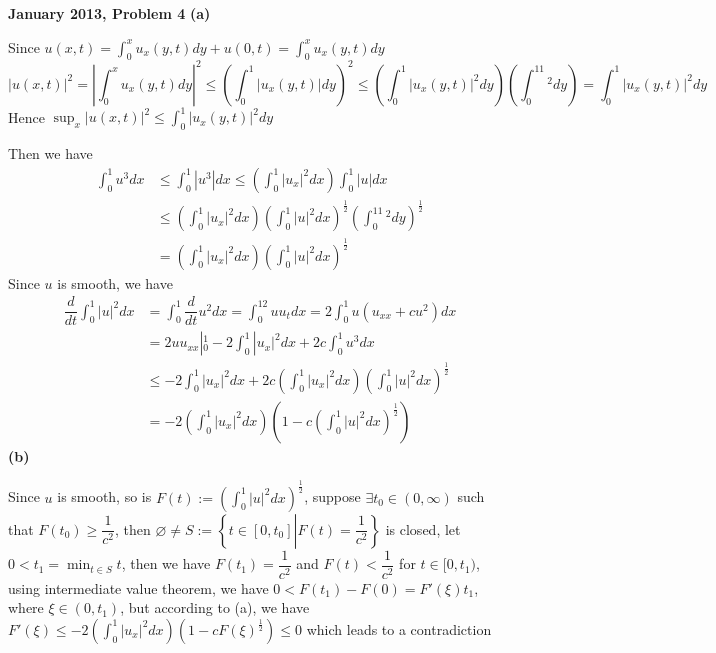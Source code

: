 \documentclass[../main.tex]{subfiles}
\begin{document}
\begin{customproblem}\textbf{January 2013, Problem 4}
\textbf{(a)} \par
Since $\displaystyle u(x,t)=\int_0^xu_x(y,t)dy+u(0,t)=\int_0^xu_x(y,t)dy$
$$\displaystyle |u(x,t)|^2=\left|\int_0^xu_x(y,t)dy\right|^2\leq\left(\int_0^1|u_x(y,t)|dy\right)^2\leq \left(\int_0^1|u_x(y,t)|^2dy\right)\left(\int_0^11^2dy\right)=\int_0^1|u_x(y,t)|^2dy$$
Hence $\displaystyle\sup_x|u(x,t)|^2\leq\int_0^1|u_x(y,t)|^2dy$ \par
Then we have
\[
\begin{aligned}
\int_0^1u^3dx&\leq\int_0^1|u^3|dx\leq \left(\int_0^1|u_x|^2dx\right)\int_0^1|u|dx \\
&\leq \left(\int_0^1|u_x|^2dx\right)\left(\int_0^1|u|^2dx\right)^\frac{1}{2}\left(\int_0^11^2dy\right)^\frac{1}{2} \\
&=\left(\int_0^1|u_x|^2dx\right)\left(\int_0^1|u|^2dx\right)^\frac{1}{2}
\end{aligned}
\]
Since $u$ is smooth, we have
\[
\begin{aligned}
\dfrac{d}{dt}\int_0^1|u|^2dx&=\int_0^1\dfrac{d}{dt}u^2dx=\int_0^12uu_tdx=2\int_0^1u(u_{xx}+cu^2)dx \\
&=2uu_{xx}|_0^1-2\int_0^1|u_x|^2dx+2c\int_0^1u^3dx \\
&\leq -2\int_0^1|u_x|^2dx+2c\left(\int_0^1|u_x|^2dx\right)\left(\int_0^1|u|^2dx\right)^\frac{1}{2} \\
&=-2\left(\int_0^1|u_x|^2dx\right)\left(1-c\left(\int_0^1|u|^2dx\right)^\frac{1}{2}\right)
\end{aligned}
\]
\textbf{(b)} \par
Since $u$ is smooth, so is $F(t):=\displaystyle\left(\int_0^1|u|^2dx\right)^\frac{1}{2}$, suppose $\exists t_0\in (0,\infty)$ such that $F(t_0)\geq \dfrac{1}{c^2}$, then $\varnothing\neq S:=\left\{t\in[0,t_0]\left|\right.F(t)=\dfrac{1}{c^2}\right\}$ is closed, let $0<t_1=\min_{t\in S}t$, then we have $F(t_1)=\dfrac{1}{c^2}$ and $F(t)<\dfrac{1}{c^2}$ for $t\in[0,t_1)$, using intermediate value theorem, we have $0<F(t_1)-F(0)=F'(\xi)t_1$, where $\xi\in(0,t_1)$, but according to (a), we have $\displaystyle F'(\xi)\leq -2\left(\int_0^1|u_x|^2dx\right)\left(1-cF(\xi)^\frac{1}{2}\right)\leq0$ which leads to a contradiction \par
\end{customproblem}
\end{document}
